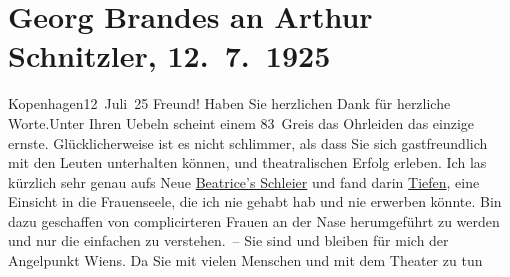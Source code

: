 

         
         \renewcommand{\erwaehntePersonen}{Personen:  ?? [Schuldirektor von Georg Brandes]}
         \renewcommand{\erwaehnteOrte}{Orte: Kopenhagen, Wien}
         \renewcommand{\erwaehnteWerke}{Werke: Der Schleier der Beatrice. Schauspiel in fünf Akten}
               \section[Georg Brandes an Arthur Schnitzler, 12. 7. 1925]{ Georg Brandes an Arthur Schnitzler, 12. 7. 1925}\nopagebreak{}\rehead{ }\begin{ledgroupsized}[t]{13cm}\normalsize\beginnumbering \toendnotes[C]{\smallbreak\pagebreak[2]} 
\toendnotes[C]{\smallbreak}\pstart
           \raggedleft{}{\pb}Kopenhagen12 Juli 25\pend
           \pstart
           Freund! Haben Sie herzlichen Dank für herzliche Worte.\hspace*{2em}Unter Ihren Uebeln scheint einem 83 Greis das Ohrleiden
               das einzige ernste. Glücklicherweise ist es nicht schlimmer, als dass Sie sich
               gastfreundlich mit den Leuten unterhalten können, und theatralischen Erfolg erleben.
               Ich las kürzlich sehr genau aufs Neue \uline{Beatrice’s Schleier} und fand darin \uline{Tiefen}, eine Einsicht in die
               Frauenseele, die ich nie gehabt hab und nie erwerben könnte. Bin dazu geschaffen von
               complicirteren Frauen an der Nase herumgeführt zu werden und nur die einfachen zu
               verstehen. – Sie sind und bleiben für mich der Angelpunkt Wiens. Da Sie mit vielen Menschen und mit dem Theater zu tun

\end{ledgroupsized}
